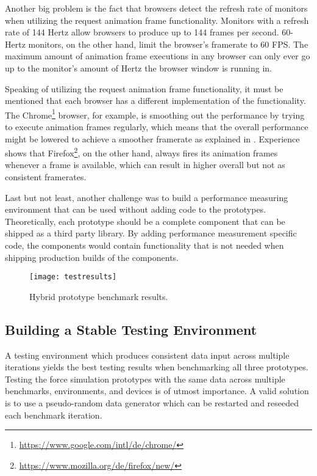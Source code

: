 Another big problem is the fact that browsers detect the refresh rate of monitors when utilizing the request animation frame functionality. Monitors with a refresh rate of 144 Hertz allow browsers to produce up to 144 frames per second. 60-Hertz monitors, on the other hand, limit the browser's framerate to 60 FPS. The maximum amount of animation frame executions in any browser can only ever go up to the monitor's amount of Hertz the browser window is running in. 

Speaking of utilizing the request animation frame functionality, it must be mentioned that each browser has a different implementation of the functionality. The Chrome\footnote{\url{https://www.google.com/intl/de/chrome/}} browser, for example, is smoothing out the performance by trying to execute animation frames regularly, which means that the overall performance might be lowered to achieve a smoother framerate as explained in \cite{ChromeRAF}. Experience shows that Firefox\footnote{\url{https://www.mozilla.org/de/firefox/new/}}, on the other hand, always fires its animation frames whenever a frame is available, which can result in higher overall but not as consistent framerates.

Last but not least, another challenge was to build a performance measuring environment that can be used without adding code to the prototypes. Theoretically, each prototype should be a complete component that can be shipped as a third party library. By adding performance measurement specific code, the components would contain functionality that is not needed when shipping production builds of the components.

\begin{figure}
  \centering
  \texttt{[image: testresults]}
  \caption{Hybrid prototype benchmark results.}
  \label{fig:reactD3benchResult}
\end{figure}

\subsection{Building a Stable Testing Environment}
\label{sub:perfImplDetails}

A testing environment which produces consistent data input across multiple iterations yields the best testing results when benchmarking all three prototypes. Testing the force simulation prototypes with the same data across multiple benchmarks, environments, and devices is of utmost importance. A valid solution is to use a pseudo-random data generator which can be restarted and reseeded each benchmark iteration.

